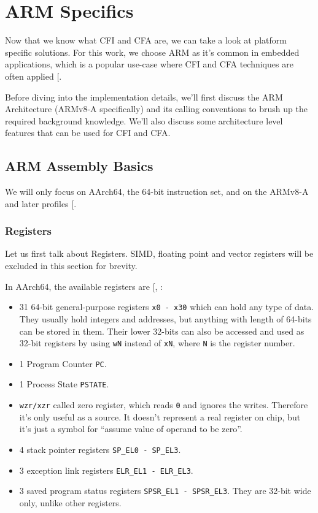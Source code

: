 \documentclass[a4paper, nobind]{templates/ociamthesis}
\providecommand{\tightlist}{%
  \setlength{\itemsep}{0pt}\setlength{\parskip}{0pt}}
\begin{document}
\section{ARM Specifics}\label{arm-specifics}

Now that we know what CFI and CFA are, we can take a look at platform specific solutions.
For this work, we choose ARM as it's common in embedded applications,
which is a popular use-case where CFI and CFA techniques are often applied {[}\citeproc{ref-sok}{5}{]}.

Before diving into the implementation details, we'll first discuss the ARM Architecture
(ARMv8-A specifically) and its calling conventions to brush up the required background knowledge.
We'll also discuss some architecture level features that can be used for CFI and CFA.

\subsection{ARM Assembly Basics}\label{arm-assembly-basics}

We will only focus on AArch64, the 64-bit instruction set, and on the ARMv8-A
and later profiles {[}\citeproc{ref-arm-arch-manual}{11}{]}.

\subsubsection{Registers}\label{registers}

Let us first talk about Registers.
SIMD, floating point and vector registers will be excluded in this section for brevity.

In AArch64, the available registers are {[}, \citeproc{ref-arm-isa}{10}{]}:

\begin{itemize}
\tightlist
\item
  31 64-bit general-purpose registers \texttt{x0\ -\ x30} which can hold any type of data.
  They usually hold integers and addresses, but anything with length of 64-bits
  can be stored in them. Their lower 32-bits can also be accessed and used as
  32-bit registers by using \texttt{wN} instead of \texttt{xN}, where \texttt{N} is the register number.
\item
  1 Program Counter \texttt{PC}.
\item
  1 Process State \texttt{PSTATE}.
\item
  \texttt{wzr/xzr} called zero register,
  which reads \texttt{0} and ignores the writes. Therefore it's only useful as a source.
  It doesn't represent a real register on chip,
  but it's just a symbol for ``assume value of operand to be zero''.
\item
  4 stack pointer registers \texttt{SP\_EL0\ -\ SP\_EL3}.
\item
  3 exception link registers \texttt{ELR\_EL1\ -\ ELR\_EL3}.
\item
  3 saved program status registers \texttt{SPSR\_EL1\ -\ SPSR\_EL3}. They are 32-bit wide only,
  unlike other registers.
\end{itemize}
\end{document}
